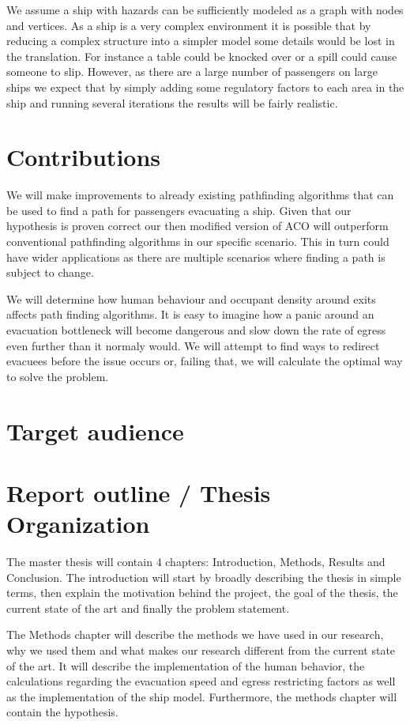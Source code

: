 We assume a ship with hazards can be sufficiently modeled as a graph with nodes and vertices. As a ship is a very complex
environment it is possible that by reducing a complex structure into a simpler model some details would be lost in the
translation. For instance a table could be knocked over or a spill could cause someone to slip. However, as there are a large number of 
passengers on large ships we expect that by simply adding some regulatory factors to each area in the ship and running
several iterations the results will be fairly realistic.

\section{Contributions}

 We will make improvements to already existing pathfinding algorithms that can be used to find a path 
for passengers evacuating a ship. Given that our hypothesis is proven
correct our then modified version of ACO will outperform conventional pathfinding algorithms in our 
specific scenario. This in turn could have wider applications as there are multiple scenarios
where finding a path is subject to change. 

We will determine how human behaviour and occupant density around exits affects path finding algorithms.
It is easy to imagine how a panic around an evacuation bottleneck will become dangerous and slow
down the rate of egress even further than it normaly would. We will attempt to find ways to redirect
evacuees before the issue occurs or, failing that, we will calculate the optimal way to solve the problem.

\section{Target audience}


\section{Report outline / Thesis Organization}

The master thesis will contain 4 chapters: Introduction, Methods, Results and Conclusion.
The introduction will start by broadly describing the thesis in simple terms, then explain the motivation behind the project,
the goal of the thesis, the current state of the art and finally the problem statement. 

The Methods chapter will describe the methods we have used in our research, why we used them and what makes
our research different from the current state of the art. It will describe the implementation of the human behavior,
the calculations regarding the evacuation speed and egress restricting factors as well as the implementation of the 
ship model. Furthermore, the methods chapter will contain the hypothesis.

